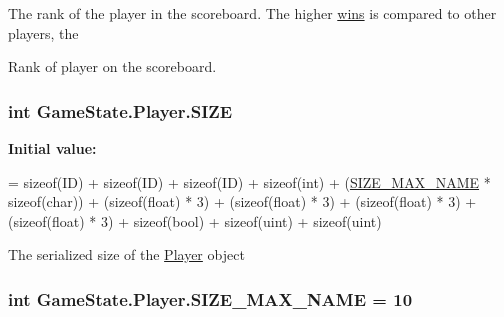 The rank of the player in the scoreboard. The higher \hyperlink{class_game_state_1_1_player_a3a4d13459cad9bd58e058ddc6387af70}{wins} is compared to other players, the 

Rank of player on the scoreboard.\hypertarget{class_game_state_1_1_player_ada2d068d3d5f973f73abac805c162d17}{
\subsubsection[{S\-I\-Z\-E}]{\setlength{\rightskip}{0pt plus 5cm}int Game\-State.\-Player.\-S\-I\-Z\-E\hspace{0.3cm}{\ttfamily [static]}}}\label{class_game_state_1_1_player_ada2d068d3d5f973f73abac805c162d17}
{\bfseries Initial value\-:}
\begin{DoxyCode}
=
            \textcolor{keyword}{sizeof}(ID) 
            + \textcolor{keyword}{sizeof}(ID) 
            + \textcolor{keyword}{sizeof}(ID) 
            + \textcolor{keyword}{sizeof}(\textcolor{keywordtype}{int}) + (\hyperlink{class_game_state_1_1_player_a1cdc9de8183b220e87632f7f6a7147d0}{SIZE\_MAX\_NAME} * \textcolor{keyword}{sizeof}(char))
            + (\textcolor{keyword}{sizeof}(float) * 3) 
            + (\textcolor{keyword}{sizeof}(float) * 3) 
            + (\textcolor{keyword}{sizeof}(float) * 3) 
            + (\textcolor{keyword}{sizeof}(float) * 3) 
            + \textcolor{keyword}{sizeof}(bool) 
            + \textcolor{keyword}{sizeof}(uint) 
            + \textcolor{keyword}{sizeof}(uint)
\end{DoxyCode}


The serialized size of the \hyperlink{class_game_state_1_1_player}{Player} object 

\hypertarget{class_game_state_1_1_player_a1cdc9de8183b220e87632f7f6a7147d0}{
\subsubsection[{S\-I\-Z\-E\-\_\-\-M\-A\-X\-\_\-\-N\-A\-M\-E}]{\setlength{\rightskip}{0pt plus 5cm}int Game\-State.\-Player.\-S\-I\-Z\-E\-\_\-\-M\-A\-X\-\_\-\-N\-A\-M\-E = 10\hspace{0.3cm}{\ttfamily [static]}}}\label{class_game_state_1_1_player_a1cdc9de8183b220e87632f7f6a7147d0}


